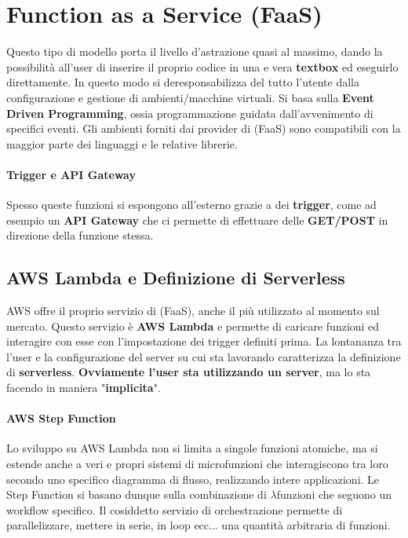 \documentclass{article}
\begin{document}
\newpage

\section{Function as a Service (FaaS)}

Questo tipo di modello porta il livello d'astrazione quasi al massimo, dando la possibilità all'user di inserire il proprio codice in una e vera \textbf{textbox} ed eseguirlo direttamente. In questo modo si deresponsabilizza del tutto l'utente dalla configurazione e gestione di ambienti/macchine virtuali. Si basa sulla \textbf{Event Driven Programming}, ossia programmazione guidata dall'avvenimento di specifici eventi. Gli ambienti forniti dai provider di (FaaS) sono compatibili con la maggior parte dei linguaggi e le relative librerie.

\paragraph{Trigger e API Gateway} Spesso queste funzioni si espongono all'esterno grazie a dei \textbf{trigger}, come ad esempio un \textbf{API Gateway} che ci permette di effettuare delle \textbf{GET/POST} in direzione della funzione stessa.

\subsection{AWS Lambda e Definizione di Serverless} AWS offre il proprio servizio di (FaaS), anche il più utilizzato al momento sul mercato. Questo servizio è \textbf{AWS Lambda} e permette di caricare funzioni ed interagire con esse con l'impostazione dei trigger definiti prima. La lontananza tra l'user e la configurazione del server su cui sta lavorando caratterizza la definizione di \textbf{serverless}. \textbf{Ovviamente l'user sta utilizzando un server}, ma lo sta facendo in maniera "\textbf{implicita}".

\paragraph{AWS Step Function} Lo sviluppo su AWS Lambda non si limita a singole funzioni atomiche, ma si estende anche a veri e propri sistemi di microfunzioni che interagiscono tra loro secondo uno specifico diagramma di flusso, realizzando intere applicazioni. Le Step Function si basano dunque sulla combinazione di $\lambda$funzioni che seguono un workflow specifico. Il cosiddetto servizio di orchestrazione permette di parallelizzare, mettere in serie, in loop ecc... una quantità arbitraria di funzioni.
\end{document}
